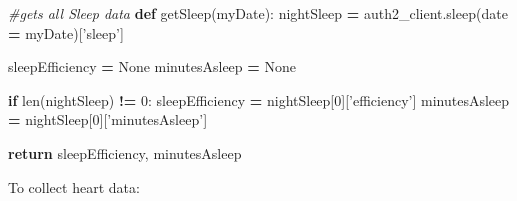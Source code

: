 \documentclass[]{book}
\newenvironment{Shaded}{\begin{snugshade}}{\end{snugshade}}
\newcommand{\KeywordTok}[1]{\textcolor[rgb]{0.13,0.29,0.53}{\textbf{#1}}}
\newcommand{\DecValTok}[1]{\textcolor[rgb]{0.00,0.00,0.81}{#1}}
\newcommand{\StringTok}[1]{\textcolor[rgb]{0.31,0.60,0.02}{#1}}
\newcommand{\CommentTok}[1]{\textcolor[rgb]{0.56,0.35,0.01}{\textit{#1}}}
\newcommand{\VariableTok}[1]{\textcolor[rgb]{0.00,0.00,0.00}{#1}}
\newcommand{\ControlFlowTok}[1]{\textcolor[rgb]{0.13,0.29,0.53}{\textbf{#1}}}
\newcommand{\OperatorTok}[1]{\textcolor[rgb]{0.81,0.36,0.00}{\textbf{#1}}}
\newcommand{\BuiltInTok}[1]{#1}
\newcommand{\NormalTok}[1]{#1}
\begin{document}
\begin{Shaded}
\begin{Highlighting}[]
\CommentTok{#gets all Sleep data}
\KeywordTok{def}\NormalTok{ getSleep(myDate): }
\NormalTok{    nightSleep }\OperatorTok{=}\NormalTok{ auth2_client.sleep(date }\OperatorTok{=}\NormalTok{ myDate)[}\StringTok{'sleep'}\NormalTok{]}
    
\NormalTok{    sleepEfficiency }\OperatorTok{=} \VariableTok{None}
\NormalTok{    minutesAsleep }\OperatorTok{=} \VariableTok{None}
    
    \ControlFlowTok{if} \BuiltInTok{len}\NormalTok{(nightSleep) }\OperatorTok{!=} \DecValTok{0}\NormalTok{:}
\NormalTok{        sleepEfficiency }\OperatorTok{=}\NormalTok{ nightSleep[}\DecValTok{0}\NormalTok{][}\StringTok{'efficiency'}\NormalTok{]}
\NormalTok{        minutesAsleep }\OperatorTok{=}\NormalTok{ nightSleep[}\DecValTok{0}\NormalTok{][}\StringTok{'minutesAsleep'}\NormalTok{]}
        
    \ControlFlowTok{return}\NormalTok{ sleepEfficiency, minutesAsleep}
\end{Highlighting}
\end{Shaded}

To collect heart data:
\end{document}
